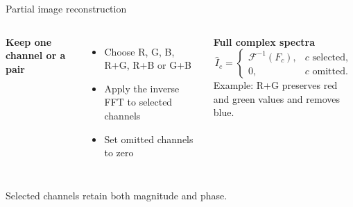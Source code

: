 \documentclass[aspectratio=169,11pt]{beamer}
\newcommand{\topic}[1]{{\color{Teal}\bfseries #1}}
\newcommand{\muted}[1]{{\color{Muted}#1}}
\begin{document}
\begin{frame}{Partial image reconstruction}
\begin{columns}[T,onlytextwidth]
\topic{Keep one channel or a pair}
\begin{itemize}\setlength\itemsep{4mm}
\item Choose R, G, B, R+G, R+B or G+B
\item Apply the inverse FFT to selected channels
\item Set omitted channels to zero
\end{itemize}
\topic{Full complex spectra}
\vspace{4mm}
\[\widehat I_c=\begin{cases}
\mathcal F^{-1}(F_c),&c\text{ selected},\\
0,&c\text{ omitted}.
\end{cases}\]
\vspace{3mm}
\muted{Example: R+G preserves red and green values and removes blue.}
\end{columns}
\vspace{6mm}
\alert{Selected channels retain both magnitude and phase.}
\end{frame}
\end{document}
